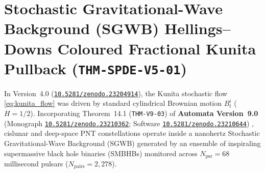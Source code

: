 \documentclass[11pt,a4paper,reqno]{article}
\newcommand{\zenodo}[1]{\href{https://doi.org/10.5281/zenodo.#1}{\nolinkurl{10.5281/zenodo.#1}}}
\theoremstyle{plain}
\theoremstyle{definition}
\theoremstyle{remark}
\numberwithin{equation}{section}
\begin{document}
\section{Stochastic Gravitational-Wave Background (SGWB) Hellings--Downs Coloured Fractional Kunita Pullback (\texttt{THM-SPDE-V5-01})}
\label{sec:spde_v5_sgwb_fractional_pullback}

In Version~4.0 (\zenodo{23204914}), the Kunita stochastic flow \eqref{eq:kunita_flow} was driven by standard cylindrical Brownian motion $B_t^i$ ($H = 1/2$). Incorporating Theorem~14.1 (\texttt{THM-V9-03}) of \textbf{Automata Version~9.0} (Monograph \zenodo{23210362}; Software \zenodo{23210644}) \cite{ananda2026automata_v90}, cislunar and deep-space PNT constellations operate inside a nanohertz Stochastic Gravitational-Wave Background (SGWB) generated by an ensemble of inspiraling supermassive black hole binaries (SMBHBs) monitored across $N_{\mathrm{psr}} = 68$ millisecond pulsars ($N_{\mathrm{pairs}} = 2{,}278$).
\end{document}

